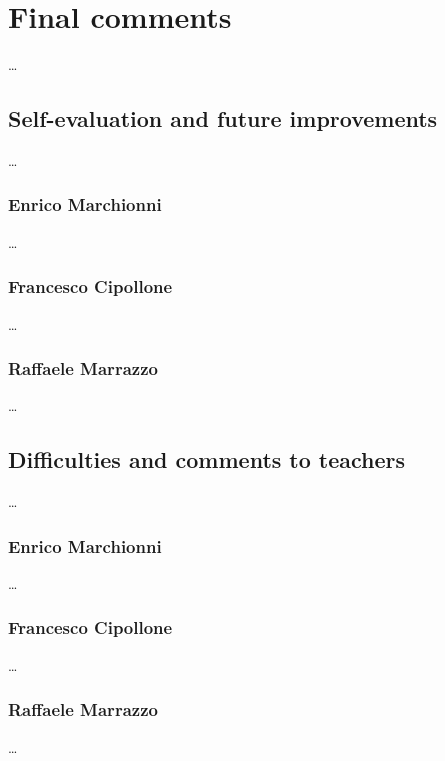 \documentclass[12pt, a4paper]{report}
\begin{document}
\chapter{Final comments}

    \dots

\section{Self-evaluation and future improvements}

    \dots

    \subsection*{Enrico Marchionni}

    \dots

    \subsection*{Francesco Cipollone}

    \dots

    \subsection*{Raffaele Marrazzo}

    \dots

\section{Difficulties and comments to teachers}

    \dots

    \subsection*{Enrico Marchionni}

    \dots

    \subsection*{Francesco Cipollone}

    \dots

    \subsection*{Raffaele Marrazzo}

    \dots
\end{document}

